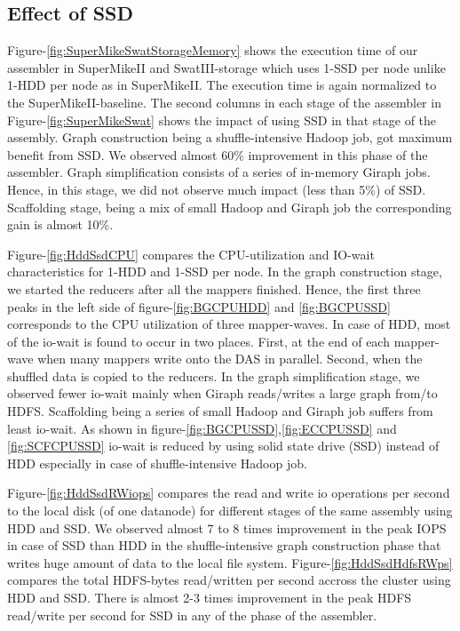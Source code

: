 \documentclass[conference]{IEEEtran}
\begin{document}
\subsection {Effect of SSD} \label{EffectOfSSD}
Figure-\ref{fig:SuperMikeSwatStorageMemory} shows the execution time of our assembler in SuperMikeII and SwatIII-storage which uses 1-SSD per node unlike 1-HDD per node as in SuperMikeII.
The execution time is again normalized to the SuperMikeII-baseline.
The second columns in each stage of the assembler in Figure-\ref{fig:SuperMikeSwat} shows the impact of using SSD in that stage of the assembly.
Graph construction being a shuffle-intensive Hadoop job, got maximum benefit from SSD. We observed almost 60\% improvement in this phase of the assembler. Graph simplification consists of a series of in-memory Giraph jobs. Hence, in this stage, we did not observe much impact (less than 5\%) of SSD. Scaffolding stage, being a mix of small Hadoop and Giraph job the corresponding gain is almost 10\%.

Figure-\ref{fig:HddSsdCPU} compares the CPU-utilization and IO-wait characteristics for 1-HDD and 1-SSD per node.
In the graph construction stage, we started the reducers after all the mappers finished. 
Hence, the first three peaks in the left side of figure-\ref{fig:BGCPUHDD} and \ref{fig:BGCPUSSD} corresponds to the CPU utilization of three mapper-waves. 
In case of HDD, most of the io-wait is found to occur in two places. First, at the end of each mapper-wave when many mappers write onto the DAS in parallel. Second, when the shuffled data is copied to the reducers.
In the graph simplification stage, we observed fewer io-wait mainly when Giraph reads/writes a large graph from/to HDFS.
Scaffolding being a series of small Hadoop and Giraph job suffers from least io-wait. 
As shown in figure-\ref{fig:BGCPUSSD},\ref{fig:ECCPUSSD} and \ref{fig:SCFCPUSSD} io-wait is reduced by using solid state drive (SSD) instead of HDD especially in case of shuffle-intensive Hadoop job. 

Figure-\ref{fig:HddSsdRWiops} compares the read and write io operations per second to the local disk (of one datanode) for different stages of the same assembly using HDD and SSD.
We observed almost 7 to 8 times improvement in the peak IOPS in case of SSD than HDD in the shuffle-intensive graph construction phase that writes huge amount of data to the local file system.
Figure-\ref{fig:HddSsdHdfsRWps} compares the total HDFS-bytes read/written per second accross the cluster using HDD and SSD. 
There is almost 2-3 times improvement in the peak HDFS read/write per second for SSD in any of the phase of the assembler.
\end{document}
